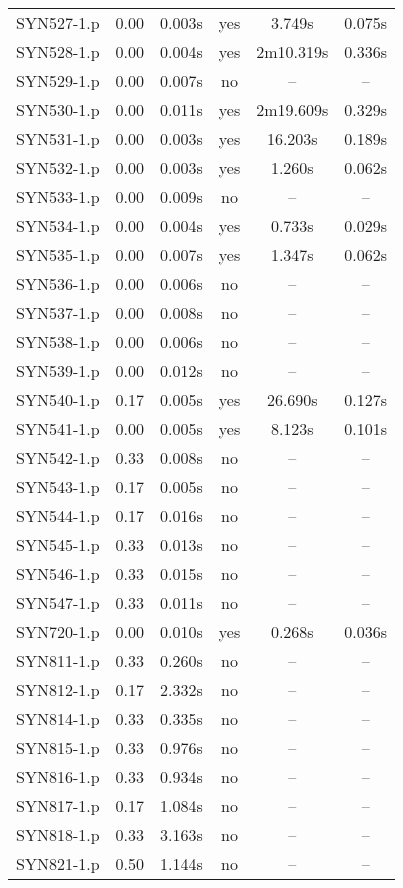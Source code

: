 \begin{center}
\begin{longtable}{||c | c | c | c | c | c||}
SYN527-1.p & 0.00 & 0.003s & yes & 3.749s & 0.075s \\
SYN528-1.p & 0.00 & 0.004s & yes & 2m10.319s & 0.336s \\
SYN529-1.p & 0.00 & 0.007s & no & -- & -- \\ 
SYN530-1.p & 0.00 & 0.011s & yes & 2m19.609s & 0.329s \\
SYN531-1.p & 0.00 & 0.003s & yes & 16.203s & 0.189s \\
SYN532-1.p & 0.00 & 0.003s & yes & 1.260s & 0.062s \\
SYN533-1.p & 0.00 & 0.009s & no & -- & -- \\
SYN534-1.p & 0.00 & 0.004s & yes & 0.733s & 0.029s \\
SYN535-1.p & 0.00 & 0.007s & yes & 1.347s & 0.062s \\
SYN536-1.p & 0.00 & 0.006s & no & -- & -- \\
SYN537-1.p & 0.00 & 0.008s & no & -- & -- \\
SYN538-1.p & 0.00 & 0.006s & no & -- & -- \\
SYN539-1.p & 0.00 & 0.012s & no & -- & -- \\
SYN540-1.p & 0.17 & 0.005s & yes & 26.690s & 0.127s \\
SYN541-1.p & 0.00 & 0.005s & yes & 8.123s & 0.101s \\
SYN542-1.p & 0.33 & 0.008s & no & -- & -- \\
SYN543-1.p & 0.17 & 0.005s & no & -- & -- \\
SYN544-1.p & 0.17 & 0.016s & no & -- & -- \\
SYN545-1.p & 0.33 & 0.013s & no & -- & -- \\
SYN546-1.p & 0.33 & 0.015s & no & -- & -- \\
SYN547-1.p & 0.33 & 0.011s & no & -- & -- \\
SYN720-1.p & 0.00 & 0.010s & yes & 0.268s & 0.036s \\
SYN811-1.p & 0.33 & 0.260s & no & -- & -- \\
SYN812-1.p & 0.17 & 2.332s & no & -- & -- \\
SYN814-1.p & 0.33 & 0.335s & no & -- & -- \\
SYN815-1.p & 0.33 & 0.976s & no & -- & -- \\
SYN816-1.p & 0.33 & 0.934s & no & -- & -- \\
SYN817-1.p & 0.17 & 1.084s & no & -- & -- \\
SYN818-1.p & 0.33 & 3.163s & no & -- & -- \\	
SYN821-1.p & 0.50 & 1.144s & no & -- & -- \\

\end{longtable}
\end{center}
